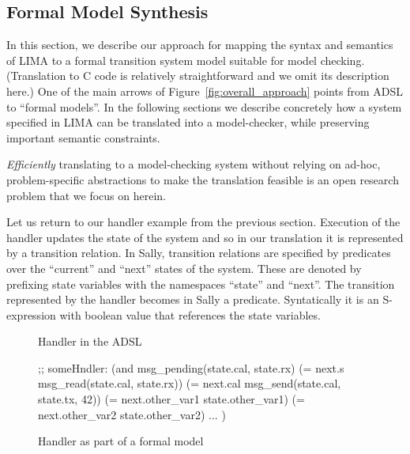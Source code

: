 \subsection{Formal Model Synthesis}\label{ssec:formal-model-synth}

In this section, we describe our approach for mapping the syntax and semantics
of LIMA to a formal transition system model suitable for model checking.
(Translation to C code is relatively straightforward and we omit its
description here.) One of the main arrows of Figure~\ref{fig:overall_approach}
points from ADSL to ``formal models''.  In the following sections we describe
concretely how a system specified in LIMA can be translated into a
model-checker, while preserving important semantic constraints.

\emph{Efficiently} translating to a model-checking system without
relying on ad-hoc, problem-specific abstractions to make the translation
feasible is an open research problem that we focus on herein.

Let us return to our handler example from the previous section. Execution of
the handler updates the state of the system and so in our translation it is
represented by a transition relation. In Sally, transition relations are
specified by predicates over the ``current'' and ``next'' states of the
system. These are denoted by prefixing state variables with the namespaces
``state'' and ``next''. The transition represented by the handler becomes in
Sally a predicate. Syntatically it is an S-expression with boolean value that
references the state variables.

\begin{figure}[ht]
\centering
{}
\caption{Handler in the ADSL}
\label{fig:adsl-handler}
\end{figure}
%
%
\begin{figure}
\centering
\begin{sally}
;; someHndler:
(and msg_pending(state.cal, state.rx)
   (= next.s           msg_read(state.cal, state.rx))
   (= next.cal         msg_send(state.cal, state.tx, 42))
   (= next.other_var1  state.other_var1)
   (= next.other_var2  state.other_var2)
   ... )
\end{sally}
\caption{Handler as part of a formal model}
\label{fig:sally-handler}
\end{figure}

